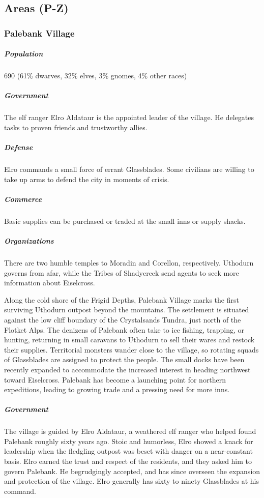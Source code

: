 \documentclass[10pt,a4paper,twoside,bg=print,twocolumn,openany,nodeprecatedcode]{dndbook}
\begin{document}
\subsection{Areas (P-Z)}
\subsubsection{Palebank Village}
\subparagraph{Population}
690 (61\% dwarves, 32\% elves, 3\% gnomes, 4\% other races)

\subparagraph{Government}
The elf ranger Elro Aldataur is the appointed leader of the village. He delegates tasks to proven friends and trustworthy allies.

\subparagraph{Defense}
Elro commands a small force of errant Glassblades. Some civilians are willing to take up arms to defend the city in moments of crisis.

\subparagraph{Commerce}
Basic supplies can be purchased or traded at the small inns or supply shacks.

\subparagraph{Organizations}
There are two humble temples to Moradin and Corellon, respectively. Uthodurn governs from afar, while the Tribes of Shadycreek send agents to seek more information about Eiselcross.

Along the cold shore of the Frigid Depths, Palebank Village marks the first surviving Uthodurn outpost beyond the mountains. The settlement is situated against the low cliff boundary of the Crystalsands Tundra, just north of the Flotket Alps. The denizens of Palebank often take to ice fishing, trapping, or hunting, returning in small caravans to Uthodurn to sell their wares and restock their supplies. Territorial monsters wander close to the village, so rotating squads of Glassblades are assigned to protect the people. The small docks have been recently expanded to accommodate the increased interest in heading northwest toward Eiselcross. Palebank has become a launching point for northern expeditions, leading to growing trade and a pressing need for more inns.

\subparagraph{Government}
The village is guided by Elro Aldataur, a weathered elf ranger who helped found Palebank roughly sixty years ago. Stoic and humorless, Elro showed a knack for leadership when the fledgling outpost was beset with danger on a near-constant basis. Elro earned the trust and respect of the residents, and they asked him to govern Palebank. He begrudgingly accepted, and has since overseen the expansion and protection of the village. Elro generally has sixty to ninety Glassblades at his command.
\end{document}
